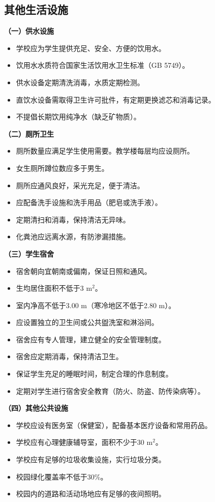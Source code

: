 \subsection{其他生活设施}

\begin{keybox}
\textbf{（一）供水设施}

\begin{itemize}[leftmargin=*]
    \item 学校应为学生提供充足、安全、方便的饮用水。
    \item 饮用水水质符合国家生活饮用水卫生标准（GB 5749）。
    \item 供水设备定期清洗消毒，水质定期检测。
    \item 直饮水设备需取得卫生许可批件，有定期更换滤芯和消毒记录。
    \item 不提倡长期饮用纯净水（缺乏矿物质）。
\end{itemize}

\textbf{（二）厕所卫生}

\begin{itemize}[leftmargin=*]
    \item 厕所数量应满足学生使用需要。教学楼每层均应设厕所。
    \item 女生厕所蹲位数应多于男生。
    \item 厕所应通风良好，采光充足，便于清洁。
    \item 应配备洗手设施和洗手用品（肥皂或洗手液）。
    \item 定期清扫和消毒，保持清洁无异味。
    \item 化粪池应远离水源，有防渗漏措施。
\end{itemize}

\textbf{（三）学生宿舍}

\begin{itemize}[leftmargin=*]
    \item 宿舍朝向宜朝南或偏南，保证日照和通风。
    \item 生均居住面积不低于3 $\mathrm{m}^2$。
    \item 室内净高不低于3.00 m（寒冷地区不低于2.80 m）。
    \item 应设置独立的卫生间或公共盥洗室和淋浴间。
    \item 宿舍应有专人管理，建立健全的安全管理制度。
    \item 宿舍应定期消毒，保持清洁卫生。
    \item 保证学生充足的睡眠时间，制定合理的作息制度。
    \item 定期对学生进行宿舍安全教育（防火、防盗、防传染病等）。
\end{itemize}

\textbf{（四）其他公共设施}

\begin{itemize}[leftmargin=*]
    \item 学校应设有医务室（保健室），配备基本医疗设备和常用药品。
    \item 学校应有心理健康辅导室，面积不少于30 $\mathrm{m}^2$。
    \item 学校应有足够的垃圾收集设施，实行垃圾分类。
    \item 校园绿化覆盖率不低于30\%。
    \item 校园内的道路和活动场地应有足够的夜间照明。
\end{itemize}
\end{keybox}

\newpage
